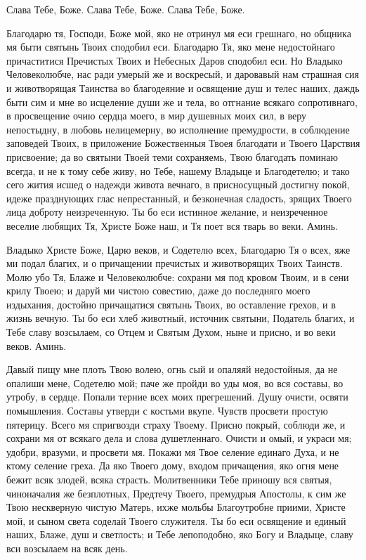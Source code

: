 \begin{mymulticols}

Слава Тебе, Боже. Слава Тебе, Боже. Слава Тебе, Боже.


Благодарю тя, Господи, Боже мой, яко не отринул мя еси грешнаго, но общника мя быти святынь Твоих сподобил еси. Благодарю Тя, яко мене недостойнаго причаститися Пречистых Твоих и Небесных Даров сподобил еси. Но Владыко Человеколюбче, нас ради умерый же и воскресый, и даровавый нам страшная сия и животворящая Таинства во благодеяние и освящение душ и телес наших, даждь быти сим и мне во исцеление души же и тела, во отгнание всякаго сопротивнаго, в просвещение очию сердца моего, в мир душевных моих сил, в веру непостыдну, в любовь нелицемерну, во исполнение премудрости, в соблюдение заповедей Твоих, в приложение Божественныя Твоея благодати и Твоего Царствия присвоение; да во святыни Твоей теми сохраняемь, Твою благодать поминаю всегда, и не к тому себе живу, но Тебе, нашему Владыце и Благодетелю; и тако сего жития исшед о надежди живота вечнаго, в присносущный достигну покой, идеже празднующих глас непрестанный, и безконечная сладость, зрящих Твоего лица доброту неизреченную. Ты бо еси истинное желание, и неизреченное веселие любящих Тя, Христе Боже наш, и Тя поет вся тварь во веки. Аминь.


Владыко Христе Боже, Царю веков, и Содетелю всех, Благодарю Тя о всех, яже ми подал благих, и о причащении пречистых и животворящих Твоих Таинств. Молю убо Тя, Блаже и Человеколюбче: сохрани мя под кровом Твоим, и в сени крилу Твоею; и даруй ми чистою совестию, даже до последняго моего издыхания, достойно причащатися святынь Твоих, во оставление грехов, и в жизнь вечную. Ты бо еси хлеб животный, источник святыни, Податель благих, и Тебе славу возсылаем, со Отцем и Святым Духом, ныне и присно, и во веки веков. Аминь.


Давый пищу мне плоть Твою волею, огнь сый и опаляяй недостойныя, да не опалиши мене, Содетелю мой; паче же пройди во уды моя, во вся составы, во утробу, в сердце. Попали терние всех моих прегрешений. Душу очисти, освяти помышления. Составы утверди с костьми вкупе. Чувств просвети простую пятерицу. Всего мя спригвозди страху Твоему. Присно покрый, соблюди же, и сохрани мя от всякаго дела и слова душетленнаго. Очисти и омый, и украси мя; удобри, вразуми, и просвети мя. Покажи мя Твое селение единаго Духа, и не ктому селение греха. Да яко Твоего дому, входом причащения, яко огня мене бежит всяк злодей, всяка страсть. Молитвенники Тебе приношу вся святыя, чиноначалия же безплотных, Предтечу Твоего, премудрыя Апостолы, к сим же Твою нескверную чистую Матерь, ихже мольбы Благоутробне приими, Христе мой, и сыном света соделай Твоего служителя. Ты бо еси освящение и единый наших, Блаже, душ и светлость; и Тебе лепоподобно, яко Богу и Владыце, славу вси возсылаем на всяк день.


\end{mymulticols}
